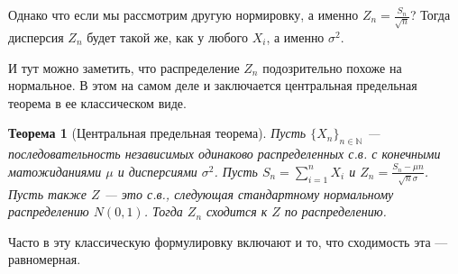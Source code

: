 \documentclass[12pt]{article}
\newcommand\N{\mathbb{N}}
\newtheorem{theorem}{Теорема}
\begin{document}
\begin{center}
\end{center}

Однако что если мы рассмотрим другую нормировку, а именно $Z_n = \frac{S_n}{\sqrt{n}}$? Тогда дисперсия $Z_n$ будет такой же, как у любого $X_i$, а именно $\sigma^2$.

\begin{center}
\end{center}

И тут можно заметить, что распределение $Z_n$ подозрительно похоже на нормальное. В этом на самом деле и заключается центральная предельная теорема в ее классическом виде.

\begin{theorem}[Центральная предельная теорема]
  Пусть $\{X_n\}_{n \in \N}$ --- последовательность независимых одинаково распределенных с.в. с конечными матожиданиями $\mu$ и дисперсиями $\sigma^2$. Пусть $S_n = \sum_{i = 1}^n X_i$ и $Z_n = \frac{S_n - \mu n}{\sqrt{n} \sigma}$. Пусть также $Z$ --- это с.в., следующая стандартному нормальному распределению $N(0, 1)$. Тогда $Z_n$ сходится к $Z$ по распределению.
  \begin{center}
  \end{center}
\end{theorem}
Часто в эту классическую формулировку включают и то, что сходимость эта --- равномерная.
\end{document}

